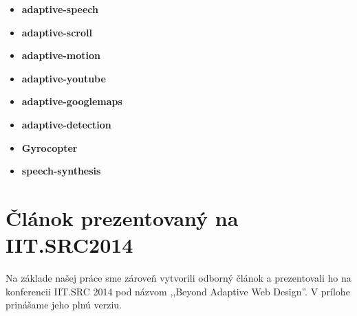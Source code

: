 \begin{itemize}
  \item \textbf{adaptive-speech}
  \item \textbf{adaptive-scroll}
  \item \textbf{adaptive-motion}
  \item \textbf{adaptive-youtube}
  \item \textbf{adaptive-googlemaps}
  \item \textbf{adaptive-detection}
  \item \textbf{Gyrocopter}
  \item \textbf{speech-synthesis}
\end{itemize}

\newpage












\newpage
\section{Článok prezentovaný na IIT.SRC2014} %
\label{sec:_l_nok_prezentovan_na_iit_src2014}

Na základe našej práce sme zároveň vytvorili odborný článok a prezentovali ho na konferencii IIT.SRC 2014 pod názvom ,,Beyond Adaptive Web Design''. V prílohe prinášame jeho plnú verziu.



